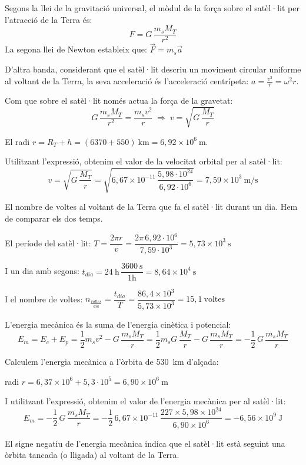 \begin{solapartat}
 Segons la llei de la gravitació universal, el mòdul de la força sobre el satèl·lit per l'atracció de la Terra és:
\[ F = G\,\frac{m_s M_T}{r^2} \]
La segona llei de Newton estableix que: $\vec{F} = m_s\vec{a}$

D'altra banda, considerant que el satèl·lit descriu un moviment circular uniforme al voltant de la Terra, la seva acceleració és l'acceleració centrípeta: $a = \frac{v^2}{r} = \omega^2 r$.

Com que sobre el satèl·lit només actua la força de la gravetat:
\[ G\,\frac{m_s M_T}{r^2} = \frac{m_s v^2}{r} \;\Rightarrow\; v = \sqrt{G\,\frac{M_T}{r}} \]

 El radi $r = R_T + h = (6370 + 550)\ \mathrm{km} = 6,92\times 10^{6}\ \mathrm{m}$.

Utilitzant l'expressió, obtenim el valor de la velocitat orbital per al satèl·lit:
\[ v = \sqrt{G\,\frac{M_T}{r}} = \sqrt{6,67\times 10^{-11}\,\frac{5,98\cdot 10^{24}}{6,92\cdot 10^{6}}} = 7,59\times 10^{3}\ \mathrm{m/s} \]

 El nombre de voltes al voltant de la Terra que fa el satèl·lit durant un dia. Hem de comparar els dos temps.

El període del satèl·lit: $T = \dfrac{2\pi r}{v} = \dfrac{2\pi\, 6,92\cdot 10^{6}}{7,59\cdot 10^{3}} = 5,73\times 10^{3}\ \mathrm{s}$

I un dia amb segons: $t_{dia} = 24\ \mathrm{h}\,\dfrac{3600\ \mathrm{s}}{1\mathrm{h}} = 8,64\times 10^{4}\ \mathrm{s}$

I el nombre de voltes: $n_{\frac{voltes}{dia}} = \dfrac{t_{dia}}{T} = \dfrac{86,4\times 10^{3}}{5,73\times 10^{3}} = 15,1\ \text{voltes}$
\end{solapartat}

\begin{solapartat}
 L'energia mecànica és la suma de l'energia cinètica i potencial:
\[ E_m = E_c + E_p = \frac{1}{2} m_s v^2 - G\,\frac{m_s M_T}{r} = \frac{1}{2} m_s G\,\frac{M_T}{r} - G\,\frac{m_s M_T}{r} = -\frac{1}{2}\,G\,\frac{m_s M_T}{r} \]

 Calculem l'energia mecànica a l'òrbita de 530~km d'alçada:

radi $r = 6,37\times 10^{6} + 5,3\cdot 10^{5} = 6,90\times 10^{6}\ \mathrm{m}$

I utilitzant l'expressió, obtenim el valor de l'energia mecànica per al satèl·lit:
\[ E_m = -\frac{1}{2}\,G\,\frac{m_s M_T}{r} = -\frac{1}{2}\,6,67\times 10^{-11}\,\frac{227\times 5,98\times 10^{24}}{6,90\times 10^{6}} = -6,56\times 10^{9}\ \mathrm{J} \]

 El signe negatiu de l'energia mecànica indica que el satèl·lit està seguint una òrbita tancada (o lligada) al voltant de la Terra.
\end{solapartat}
